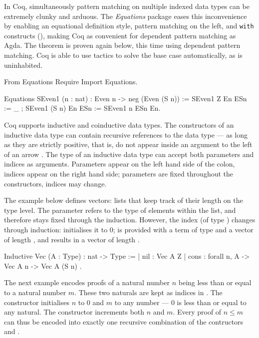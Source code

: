 \documentclass{mproj}
\begin{document}
In Coq, simultaneously pattern matching on multiple indexed data types can be extremely clunky and arduous. The \emph{Equations} package eases this inconvenience by enabling an equational definition style, pattern matching on the left, and \texttt{with} constructs (\cite{McBride2004}), making Coq as convenient for dependent pattern matching as Agda. The theorem  is proven again below, this time using dependent pattern matching. Coq is able to use tactics to solve the base case automatically, as  is uninhabited.

\begin{coq}
    From Equations Require Import Equations.

    Equations SEven1 (n : nat) : Even n -> neg (Even (S n)) := {
    SEven1 Z     En ESn := _ ;
    SEven1 (S n) En ESn := SEven1 n ESn En}.
\end{coq}

Coq supports inductive and coinductive data types. The constructors of an inductive data type can contain recursive references to the data type --- as long as they are strictly positive, that is, do not appear inside an argument to the left of an arrow \cite{Dybjer1994}. The type of an inductive data type can accept both parameters and indices as arguments. Parameters appear on the left hand side of the colon, indices appear on the right hand side; parameters are fixed throughout the constructors, indices may change.

The example below defines vectors: lists that keep track of their length on the type level. The parameter  refers to the type of elements within the list, and therefore stays fixed through the induction. However, the index (of type ) changes through induction:  initialises it to 0;  is provided with a term of type  and a vector of length , and results in a vector of length .

\begin{coq}
    Inductive Vec (A : Type) : nat -> Type :=
    | nil  : Vec A Z
    | cons : forall {n}, A -> Vec A n -> Vec A (S n)
    .
\end{coq}

The next example encodes proofs of a natural number $n$ being less than or equal to a natural number $m$. These two naturals are kept as indices in . The constructor  initialises $n$ to 0 and $m$ to any number --- 0 is less than or equal to any natural. The constructor  increments both $n$ and $m$. Every proof of $n \leq m$ can thus be encoded into exactly one recursive combination of the contructors  and .
\end{document}
